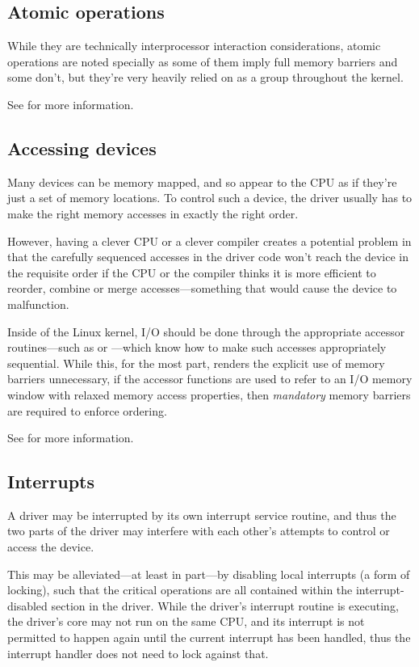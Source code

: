 \subsection{Atomic operations}

While they are technically interprocessor interaction considerations, atomic
operations are noted specially as some of them imply full memory barriers and
some don't, but they're very heavily relied on as a group throughout the
kernel.

See  for more information.

\subsection{Accessing devices}

Many devices can be memory mapped, and so appear to the CPU as if they're just
a set of memory locations.
To control such a device, the driver usually has to make the right memory
accesses in exactly the right order.

However, having a clever CPU or a clever compiler creates a potential problem
in that the carefully sequenced accesses in the driver code won't reach the
device in the requisite order if the CPU or the compiler thinks it is more
efficient to reorder, combine or merge accesses---something that would cause
the device to malfunction.

Inside of the Linux kernel, I/O should be done through the appropriate accessor
routines---such as  or ---which know how to make such
accesses appropriately sequential.
While this, for the most part, renders the explicit use of memory barriers
unnecessary, if the accessor functions are used to refer to an I/O memory
window with relaxed memory access properties, then \emph{mandatory} memory
barriers are required to enforce ordering.

See  for more information.


\subsection{Interrupts}

A driver may be interrupted by its own interrupt service routine, and thus the
two parts of the driver may interfere with each other's attempts to control or
access the device.

This may be alleviated---at least in part---by disabling local interrupts (a
form of locking), such that the critical operations are all contained within
the interrupt-disabled section in the driver.
While the driver's interrupt routine is executing, the driver's core may
not run on the same CPU, and its interrupt is not permitted to happen again
until the current interrupt has been handled, thus the interrupt handler
does not need to lock against that.

